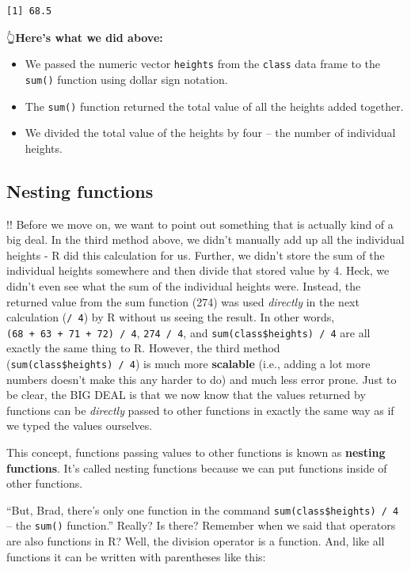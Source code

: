 \documentclass[
  letterpaper,
  DIV=11,
  numbers=noendperiod]{scrreprt}
\begin{document}
\begin{verbatim}
[1] 68.5
\end{verbatim}

👆\textbf{Here's what we did above:}

\begin{itemize}
\item
  We passed the numeric vector \texttt{heights} from the \texttt{class}
  data frame to the \texttt{sum()} function using dollar sign notation.
\item
  The \texttt{sum()} function returned the total value of all the
  heights added together.
\item
  We divided the total value of the heights by four -- the number of
  individual heights.
\end{itemize}

\subsection{Nesting functions}\label{nesting-functions}

{!!} Before we move on, we want to point out something that is actually
kind of a big deal. In the third method above, we didn't manually add up
all the individual heights - R did this calculation for us. Further, we
didn't store the sum of the individual heights somewhere and then divide
that stored value by 4. Heck, we didn't even see what the sum of the
individual heights were. Instead, the returned value from the sum
function (274) was used \emph{directly} in the next calculation
(\texttt{/\ 4}) by R without us seeing the result. In other words,
\texttt{(68\ +\ 63\ +\ 71\ +\ 72)\ /\ 4}, \texttt{274\ /\ 4}, and
\texttt{sum(class\$heights)\ /\ 4} are all exactly the same thing to R.
However, the third method (\texttt{sum(class\$heights)\ /\ 4}) is much
more \textbf{scalable} (i.e., adding a lot more numbers doesn't make
this any harder to do) and much less error prone. Just to be clear, the
BIG DEAL is that we now know that the values returned by functions can
be \emph{directly} passed to other functions in exactly the same way as
if we typed the values ourselves.

This concept, functions passing values to other functions is known as
\textbf{nesting functions}. It's called nesting functions because we can
put functions inside of other functions.

``But, Brad, there's only one function in the command
\texttt{sum(class\$heights)\ /\ 4} -- the \texttt{sum()} function.''
Really? Is there? Remember when we said that operators are also
functions in R? Well, the division operator is a function. And, like all
functions it can be written with parentheses like this:
\end{document}
